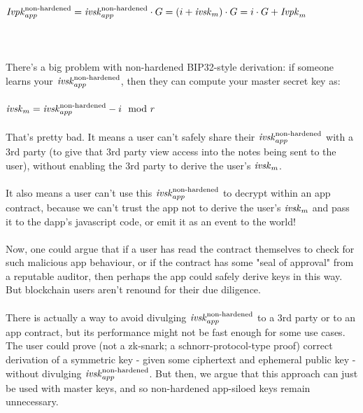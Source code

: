 $\Ivpkappnonhardened = \ivskappnonhardened \cdot G = (i + \ivskm) \cdot G = i \cdot G + \Ivpkm$\\
\\
\\ 
\\
There's a big problem with non-hardened BIP32-style derivation: if someone learns your $\ivskappnonhardened$, then they can compute your master secret key as:\\
\\
$\ivskm = \ivskappnonhardened - i \mod r$\\
\\
That's pretty bad. It means a user can't safely share their $\ivskappnonhardened$ with a 3rd party (to give that 3rd party view access into the notes being sent to the user), without enabling the 3rd party to derive the user's $\ivskm$.\\
\\
It also means a user can't use this $\ivskappnonhardened$ to decrypt within an app contract, because we can't trust the app not to derive the user's $\ivskm$ and pass it to the dapp's javascript code, or emit it as an event to the world!\\
\\
Now, one could argue that if a user has read the contract themselves to check for such malicious app behaviour, or if the contract has some "seal of approval" from a reputable auditor, then perhaps the app could safely derive keys in this way. But blockchain users aren't renound for their due diligence.\\
\\
There is actually a way to avoid divulging $\ivskappnonhardened$ to a 3rd party or to an app contract, but its performance might not be fast enough for some use cases. The user could prove (not a zk-snark; a schnorr-protocol-type proof) correct derivation of a symmetric key - given some ciphertext and ephemeral public key - without divulging $\ivskappnonhardened$. But then, we argue that this approach can just be used with master keys, and so non-hardened app-siloed keys remain unnecessary.